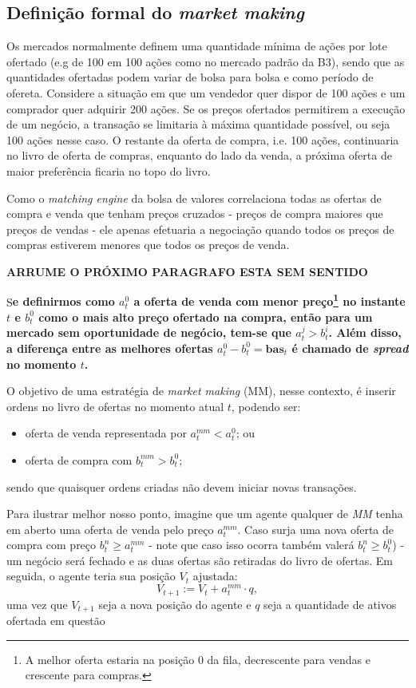 \subsection{Definição formal do \textit{market making}}

Os mercados normalmente definem uma quantidade mínima de ações por lote ofertado (e.g de 100 em 100 ações como no mercado padrão da B3), sendo que as quantidades ofertadas podem variar de bolsa para bolsa e como período de ofereta. Considere a situação em que um vendedor quer dispor de 100 ações e um comprador quer adquirir 200 ações. Se os preços ofertados permitirem a execução de um negócio, a transação se limitaria à máxima quantidade possível, ou seja 100 ações nesse caso. O restante da oferta de compra, i.e. 100 ações, continuaria no livro de oferta de compras, enquanto do lado da venda, a próxima oferta de maior preferência ficaria no topo do livro.

Como o \textit{matching engine} da bolsa de valores correlaciona todas as ofertas de compra e venda que tenham preços cruzados - preços de compra maiores que preços de vendas - ele apenas efetuaria a negociação quando todos os preços de compras estiverem menores que todos os preços de venda. 

\textbf{ARRUME O PRÓXIMO PARAGRAFO ESTA SEM SENTIDO}

S\textbf{e definirmos como $a^{0}_{t}$ a oferta de venda com menor preço\footnote{A melhor oferta estaria na posição 0 da fila, decrescente para vendas e crescente para compras.} no instante $t$ e $b^{0}_{t}$ como o mais alto preço ofertado na compra, então para um mercado sem oportunidade de negócio, tem-se que $a^{j}_{t} > b^{i}_{t}$. Além disso, a diferença entre as melhores ofertas $a^{0}_{t} - b^{0}_{t} = \mathbf{bas}_t$ é chamado de \textit{spread} no momento $t$.}

O objetivo de uma estratégia de \textit{market making} (MM), nesse contexto, é inserir ordens no livro de ofertas no momento atual $t$, podendo ser: 

\begin{itemize}
    \item oferta de venda representada por $a^{mm}_{t} < a^{0}_{t}$; ou 
    \item oferta de compra com $b^{mm}_{t} > b^{0}_{t}$;
\end{itemize}
sendo que quaisquer ordens criadas não devem iniciar novas transações.

Para ilustrar melhor nosso ponto, imagine que um agente qualquer de \textit{MM} tenha em aberto uma oferta de venda pelo preço $a^{mm}_{t}$. Caso surja uma nova oferta de compra com preço $b^{n}_{t} \geq a^{mm}_{t}$ - note que caso isso ocorra também valerá $b^{n}_{t} \geq b^{0}_{t}$) - um negócio será fechado e as duas ofertas são retiradas do livro de ofertas. Em seguida, o agente teria sua posição $V_{t}$ ajustada:
\begin{equation}
    V_{t + 1}:= V_{t} + a^{mm}_{t}\cdot q,
\end{equation}
uma vez que $V_{t + 1}$ seja a nova posição do agente e $q$ seja  a quantidade de ativos ofertada em questão 

